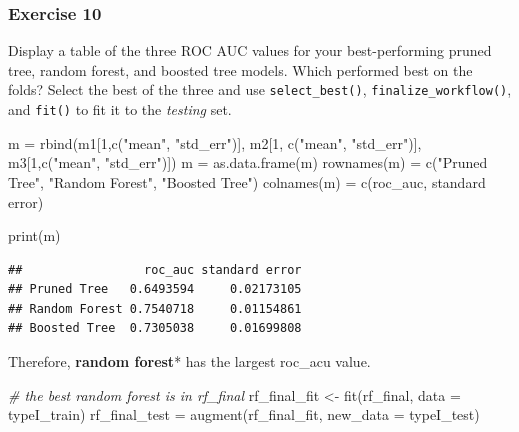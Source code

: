 \documentclass[
]{article}
\newenvironment{Shaded}{\begin{snugshade}}{\end{snugshade}}
\newcommand{\AttributeTok}[1]{\textcolor[rgb]{0.77,0.63,0.00}{#1}}
\newcommand{\CommentTok}[1]{\textcolor[rgb]{0.56,0.35,0.01}{\textit{#1}}}
\newcommand{\DecValTok}[1]{\textcolor[rgb]{0.00,0.00,0.81}{#1}}
\newcommand{\FunctionTok}[1]{\textcolor[rgb]{0.00,0.00,0.00}{#1}}
\newcommand{\NormalTok}[1]{#1}
\newcommand{\OtherTok}[1]{\textcolor[rgb]{0.56,0.35,0.01}{#1}}
\newcommand{\StringTok}[1]{\textcolor[rgb]{0.31,0.60,0.02}{#1}}
\begin{document}
\hypertarget{exercise-10}{%
\subsubsection{Exercise 10}\label{exercise-10}}

Display a table of the three ROC AUC values for your best-performing
pruned tree, random forest, and boosted tree models. Which performed
best on the folds? Select the best of the three and use
\texttt{select\_best()}, \texttt{finalize\_workflow()}, and
\texttt{fit()} to fit it to the \emph{testing} set.

\begin{Shaded}
\begin{Highlighting}[]
\NormalTok{m }\OtherTok{=} \FunctionTok{rbind}\NormalTok{(m1[}\DecValTok{1}\NormalTok{,}\FunctionTok{c}\NormalTok{(}\StringTok{"mean"}\NormalTok{, }\StringTok{"std\_err"}\NormalTok{)], m2[}\DecValTok{1}\NormalTok{, }\FunctionTok{c}\NormalTok{(}\StringTok{"mean"}\NormalTok{, }\StringTok{"std\_err"}\NormalTok{)], }
\NormalTok{          m3[}\DecValTok{1}\NormalTok{,}\FunctionTok{c}\NormalTok{(}\StringTok{"mean"}\NormalTok{, }\StringTok{"std\_err"}\NormalTok{)])}
\NormalTok{m }\OtherTok{=} \FunctionTok{as.data.frame}\NormalTok{(m)}
\FunctionTok{rownames}\NormalTok{(m) }\OtherTok{=} \FunctionTok{c}\NormalTok{(}\StringTok{"Pruned Tree"}\NormalTok{, }\StringTok{"Random Forest"}\NormalTok{, }\StringTok{"Boosted Tree"}\NormalTok{) }
\FunctionTok{colnames}\NormalTok{(m) }\OtherTok{=} \FunctionTok{c}\NormalTok{(}\StringTok{\textquotesingle{}roc\_auc\textquotesingle{}}\NormalTok{, }\StringTok{\textquotesingle{}standard error\textquotesingle{}}\NormalTok{)}

\FunctionTok{print}\NormalTok{(m)}
\end{Highlighting}
\end{Shaded}

\begin{verbatim}
##                 roc_auc standard error
## Pruned Tree   0.6493594     0.02173105
## Random Forest 0.7540718     0.01154861
## Boosted Tree  0.7305038     0.01699808
\end{verbatim}

Therefore, \textbf{random forest}* has the largest roc\_acu value.

\begin{Shaded}
\begin{Highlighting}[]
\CommentTok{\# the best random forest is in rf\_final}
\NormalTok{rf\_final\_fit }\OtherTok{\textless{}{-}} \FunctionTok{fit}\NormalTok{(rf\_final, }\AttributeTok{data =}\NormalTok{ typeI\_train)}
\NormalTok{rf\_final\_test }\OtherTok{=} \FunctionTok{augment}\NormalTok{(rf\_final\_fit, }\AttributeTok{new\_data =}\NormalTok{ typeI\_test)}
\end{Highlighting}
\end{Shaded}
\end{document}
